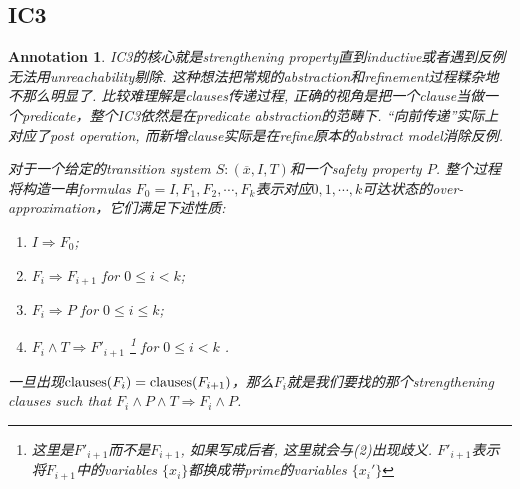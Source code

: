 \documentclass{article}
\newtheorem{annotation}[theorem]{Annotation}
\begin{document}
\subsection{IC3}

\begin{annotation}
\rm IC3的核心就是strengthening property直到inductive或者遇到反例无法用unreachability剔除. 这种想法把常规的abstraction和refinement过程糅杂地不那么明显了. 比较难理解是clauses传递过程, 正确的视角是把一个clause当做一个predicate，整个IC3依然是在predicate abstraction的范畴下. “向前传递”实际上对应了post operation, 而新增clause实际是在refine原本的abstract model消除反例. 

对于一个给定的transition system $S:(\overline{x}, I, T)$和一个safety property $P$. 整个过程将构造一串formulas $F_0 = I,F_1,F_2,\cdots,F_k$表示对应$0, 1, \cdots, k$可达状态的over-approximation，它们满足下述性质:
\begin{enumerate}
    \item $I \Rightarrow F_0$;
    \item $F_i \Rightarrow F_{i+1}$ for $0 \leq i < k$;
    \item $F_i \Rightarrow P$ for $0 \leq i \leq k$;
    \item $F_i \wedge T \Rightarrow F'_{i+1}$ \footnote{这里是$F'_{i+1}$而不是$F_{i+1}$, 如果写成后者, 这里就会与(2)出现歧义. $F'_{i+1}$表示将$F_{i+1}$中的variables $\{x_i\} $都换成带prime的variables $\{x_i'\}$} for $0 \leq i < k$ .
\end{enumerate}
一旦出现$\textup{clauses}(F_i) = \textup{clauses}(F_{i+1})$，那么$F_i$就是我们要找的那个strengthening clauses such that $F_i \wedge P \wedge T \Rightarrow F_i \wedge P$.


\end{annotation}
\end{document}
